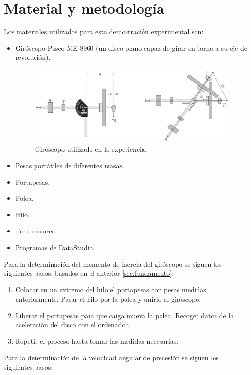\documentclass[a4paper]{article}
\begin{document}
\section{Material y metodología} \label{sec:metodo}
Los materiales utilizados para esta demostración experimental son:
\begin{itemize}
\item Giróscopo Pasco ME 8960 (un disco plano capaz de girar en torno a su eje de revolución).
\begin{figure}[H]
\begin{center}
\includegraphics[width=12cm]{disco2.png}
\caption{Giróscopo utilizado en la experiencia.}
\end{center}
\end{figure}
\item Pesas portátiles de diferentes masas.
\item Portapesas.
\item Polea.
\item Hilo.
\item Tres sensores.
\item Programas de DataStudio.
\end{itemize}
Para la determinación del momento de inercia del giróscopo se siguen los siguientes pasos, basados en el anterior \ref{sec:fundamento}:
\begin{enumerate}
\item Colocar en un extremo del hilo el portapesas con pesas medidas anteriormente. Pasar el hilo por la polea y unirlo al giróscopo.
\item Liberar el portapesas para que caiga mueva la polea. Recoger datos de la aceleración del disco con el ordenador. 
\item Repetir el proceso hasta tomar las medidas necesarias.
\end{enumerate}
Para la determinación de la velocidad angular de precesión se siguen los siguientes pasos:
\end{document}
